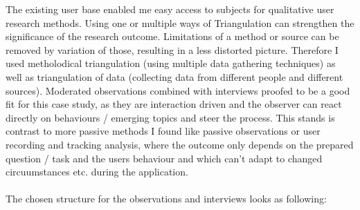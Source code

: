 The existing user base enabled me easy access to subjects for qualitative user research methods.
Using one or multiple ways of Triangulation \cite[p. 264]{Interactiondesign:2019ys} can strengthen the significance of the research outcome. Limitations of a method or source can be removed by variation of those, resulting in a less distorted picture.
Therefore I used metholodical triangulation (using multiple data gathering techniques) as well as triangulation of data (collecting data from different people and different sources).
Moderated observations combined with interviews proofed to be a good fit for this case study, as they are interaction driven and the observer can react directly on behaviours / emerging topics and steer the process.
This stands is contrast to more passive methods I found like passive observations or user recording and tracking analysis, where the outcome only depends on the
prepared question / task and the users behaviour and which can't adapt to changed circuumstances etc. during the application.
\\\\
The chosen structure for the observations and interviews looks as following:

